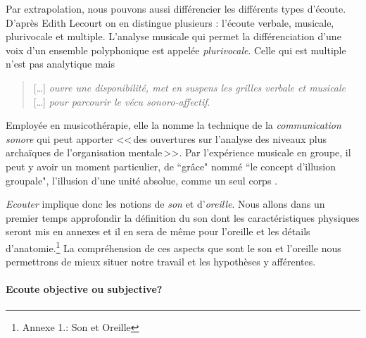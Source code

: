 Par extrapolation, nous pouvons aussi différencier les différents types d'écoute. D'après Edith Lecourt \autocite[ch. 10 <<\,De l'écoute verbale à l'écoute musicale\,>>, p. 182.]{lecourt:decouvrir}
 on en distingue plusieurs : l'écoute verbale, musicale, plurivocale et multiple.
 L'analyse musicale qui permet la différenciation d'une voix d'un ensemble polyphonique est appelée \emph{plurivocale}. Celle qui est multiple n'est pas analytique  mais 
 \begin{quote}
 	 [\ldots] \textit{ouvre une disponibilité, met en suspens les grilles verbale et musicale} [\ldots] \emph{pour parcourir le vécu sonoro-affectif}\autocite[p. 183]{lecourt:decouvrir}.
 \end{quote}
 Employée en musicothérapie, elle la nomme la technique de la  \emph{communication sonore} qui peut apporter 
 <<\,des ouvertures sur l'analyse des niveaux plus archaïques de l'organisation mentale\,>>\autocite[p. 154]{lecourt:decouvrir}.	
 Par l'expérience musicale en groupe, il peut y avoir un moment
 particulier, de ``grâce"  nommé ``le concept d'illusion groupale",
 l'illusion d'une unité absolue, comme un seul corps \autocite{anzieu:groupal}.

\emph{Ecouter} implique donc les notions de \emph{son} et
d'\emph{oreille}. Nous allons dans un premier temps approfondir  la
définition du son dont les caractéristiques physiques seront mis en
annexes et il en sera de même pour l'oreille et les détails
d'anatomie.\footnote{Annexe 1.: Son et Oreille}
La compréhension de ces aspects que sont le son et l'oreille nous
permettrons de mieux situer notre travail et les hypothèses y afférentes.








\paragraph{Ecoute objective ou subjective?}

